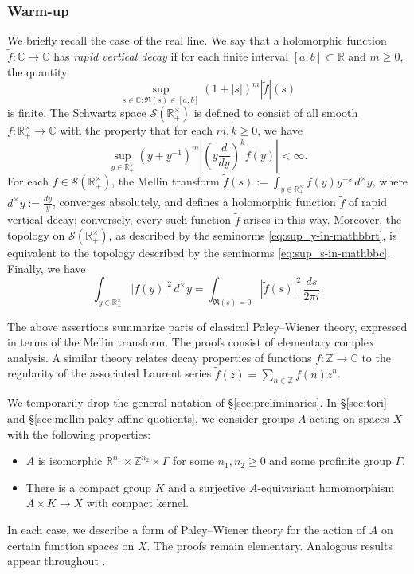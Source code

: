 \subsubsection{Warm-up}
We briefly recall the case of the real line.  We say that a holomorphic function $\tilde{f} : \mathbb{C} \rightarrow \mathbb{C}$ has \emph{rapid vertical decay} if for each finite interval $[a,b] \subset \mathbb{R}$ and $m \geq 0$, the quantity
\begin{equation}\label{eq:sup_s-in-mathbbc}
  \sup_{s \in \mathbb{C} : \Re(s) \in [a,b]}
  (1 + |s|)^m |\tilde{f}|(s)
\end{equation}
is finite.  The Schwartz space $\mathcal{S}(\mathbb{R}^\times_+)$ is defined to consist of all smooth $f : \mathbb{R}^\times_+ \rightarrow \mathbb{C}$ with the property that for each $m, k \geq 0$, we have
\begin{equation}\label{eq:sup_y-in-mathbbrt}
  \sup_{y \in \mathbb{R}^\times_+} (y + y^{-1})^m \left\lvert \left( y \frac{d}{d y} \right)^k f(y) \right\rvert < \infty.
\end{equation}
For each $f \in \mathcal{S}(\mathbb{R}^\times_+)$, the Mellin transform $\tilde{f}(s) := \int_{y \in \mathbb{R}^\times_+} f(y) y^{-s} \, d^\times y$, where $d^\times y := \frac{d y}{y}$, converges absolutely, and defines a holomorphic function $\tilde{f}$ of rapid vertical decay; conversely, every such function $\tilde{f}$ arises in this way.  Moreover, the topology on $\mathcal{S}(\mathbb{R}^\times_+)$, as described by the seminorms \eqref{eq:sup_y-in-mathbbrt}, is equivalent to the topology described by the seminorms \eqref{eq:sup_s-in-mathbbc}.  Finally, we have
\begin{equation*}
  \int  _{y \in \mathbb{R}^\times_+} |f(y)|^2 \, d^\times y
  =
  \int_{\Re(s) = 0} \left\lvert \tilde{f}(s) \right\rvert^2 \, \frac{d s}{2 \pi i }.
\end{equation*}

The above assertions summarize parts of classical Paley--Wiener theory, expressed in terms of the Mellin transform.  The proofs consist of elementary complex analysis.  A similar theory relates decay properties of functions $f : \mathbb{Z} \rightarrow \mathbb{C}$ to the regularity of the associated Laurent series $\tilde{f}(z) = \sum_{n \in \mathbb{Z}} f(n) z^n$.

We temporarily drop the general notation of \S\ref{sec:preliminaries}.  In \S\ref{sec:tori} and \S\ref{sec:mellin-paley-affine-quotients}, we consider groups $A$ acting on spaces $X$ with the following properties:
\begin{itemize}
\item $A$ is isomorphic $\mathbb{R}^{n_1} \times \mathbb{Z}^{n_2} \times \Gamma$ for some $n_1, n_2 \geq 0$ and some profinite group $\Gamma$.
\item There is a compact group $K$ and a surjective $A$-equivariant homomorphism $A \times K \rightarrow X$ with compact kernel.
\end{itemize}
In each case, we describe a form of Paley--Wiener theory for the action of $A$ on certain function spaces on $X$.  The proofs remain elementary.  Analogous results appear throughout \cite[II.1]{MR1361168}.


